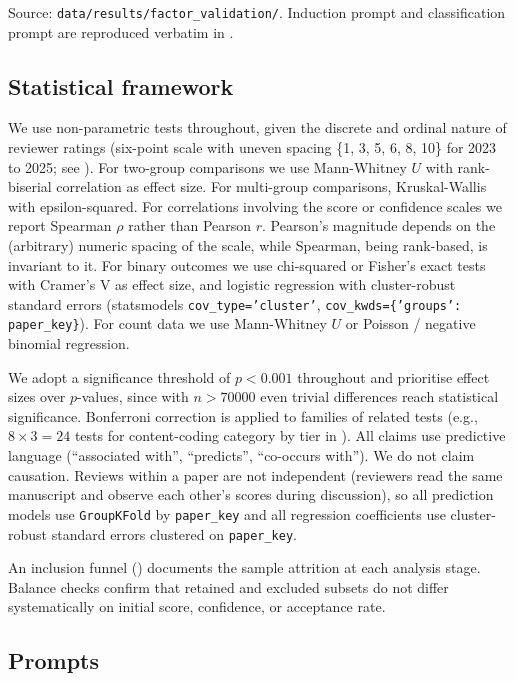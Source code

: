 \documentclass{article}
\newcommand{\code}[1]{\texttt{#1}}
\begin{document}
Source: \code{data/results/factor\_validation/}. Induction prompt and classification prompt are reproduced verbatim in .

\subsection{Statistical framework}\label{app:stats}

We use non-parametric tests throughout, given the discrete and ordinal nature of reviewer ratings (six-point scale with uneven spacing \{1, 3, 5, 6, 8, 10\} for 2023 to 2025; see ). For two-group comparisons we use Mann-Whitney $U$ with rank-biserial correlation as effect size. For multi-group comparisons, Kruskal-Wallis with epsilon-squared. For correlations involving the score or confidence scales we report Spearman $\rho$ rather than Pearson $r$. Pearson's magnitude depends on the (arbitrary) numeric spacing of the scale, while Spearman, being rank-based, is invariant to it. For binary outcomes we use chi-squared or Fisher's exact tests with Cramer's V as effect size, and logistic regression with cluster-robust standard errors (statsmodels \code{cov\_type='cluster'}, \code{cov\_kwds=\{'groups': paper\_key\}}). For count data we use Mann-Whitney $U$ or Poisson / negative binomial regression.

We adopt a significance threshold of $p < 0.001$ throughout and prioritise effect sizes over $p$-values, since with $n > \num{70000}$ even trivial differences reach statistical significance. Bonferroni correction is applied to families of related tests (e.g., $8 \times 3 = 24$ tests for content-coding category by tier in ). All claims use predictive language (``associated with'', ``predicts'', ``co-occurs with''). We do not claim causation. Reviews within a paper are not independent (reviewers read the same manuscript and observe each other's scores during discussion), so all prediction models use \texttt{GroupKFold} by \code{paper\_key} and all regression coefficients use cluster-robust standard errors clustered on \code{paper\_key}.

An inclusion funnel () documents the sample attrition at each analysis stage. Balance checks confirm that retained and excluded subsets do not differ systematically on initial score, confidence, or acceptance rate.

\subsection{Prompts}\label{app:prompts}
\end{document}
